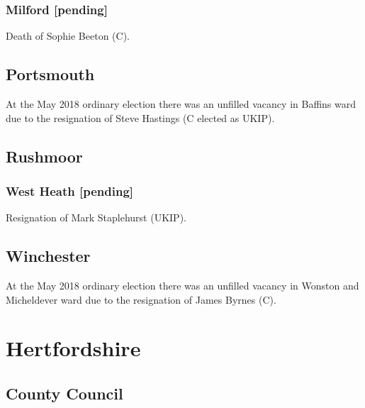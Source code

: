 \documentclass[a4paper,openany]{book}
\begin{document}
\begin{resultsiii}
\subsubsection*{Milford \hspace*{\fill}\nolinebreak[1]%
\enspace\hspace*{\fill}
[pending]}


Death of Sophie Beeton (C).

\subsection*{Portsmouth}

At the May 2018 ordinary election there was an unfilled vacancy in Baffins ward due to the resignation of Steve Hastings (C elected as UKIP).

\subsection*{Rushmoor}

\subsubsection*{West Heath \hspace*{\fill}\nolinebreak[1]%
\enspace\hspace*{\fill}
[pending]}


Resignation of Mark Staplehurst (UKIP).

\subsection*{Winchester}

At the May 2018 ordinary election there was an unfilled vacancy in Wonston and Micheldever ward due to the resignation of James Byrnes (C).

\section{Hertfordshire}

\subsection*{County Council}


\end{resultsiii}
\end{document}
